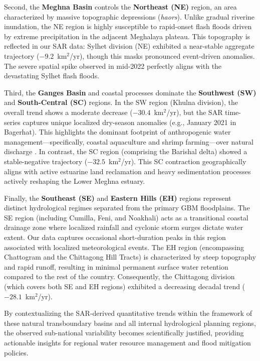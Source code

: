 \documentclass[fleqn,10pt,twocolumn]{article}
\begin{document}
Second, the \textbf{Meghna Basin} controls the \textbf{Northeast (NE)} region, an area characterized by massive topographic depressions (\textit{haors}). Unlike gradual riverine inundation, the NE region is highly susceptible to rapid-onset flash floods driven by extreme precipitation in the adjacent Meghalaya plateau. This topography is reflected in our SAR data: Sylhet division (NE) exhibited a near-stable aggregate trajectory ($-9.2$~km$^2$/yr), though this masks pronounced event-driven anomalies. The severe spatial spike observed in mid-2022 perfectly aligns with the devastating Sylhet flash floods.

Third, the \textbf{Ganges Basin} and coastal processes dominate the \textbf{Southwest (SW)} and \textbf{South-Central (SC)} regions. In the SW region (Khulna division), the overall trend shows a moderate decrease ($-30.4$~km$^2$/yr), but the SAR time-series captures unique localized dry-season anomalies (e.g., January 2021 in Bagerhat). This highlights the dominant footprint of anthropogenic water management---specifically, coastal aquaculture and shrimp farming---over natural discharge \cite{paul2013, haque2022}. In contrast, the SC region (comprising the Barishal delta) showed a stable-negative trajectory ($-32.5$~km$^2$/yr). This SC contraction geographically aligns with active estuarine land reclamation and heavy sedimentation processes actively reshaping the Lower Meghna estuary.

Finally, the \textbf{Southeast (SE)} and \textbf{Eastern Hills (EH)} regions represent distinct hydrological regimes separated from the primary GBM floodplains. The SE region (including Cumilla, Feni, and Noakhali) acts as a transitional coastal drainage zone where localized rainfall and cyclonic storm surges dictate water extent. Our data captures occasional short-duration peaks in this region associated with localized meteorological events. The EH region (encompassing Chattogram and the Chittagong Hill Tracts) is characterized by steep topography and rapid runoff, resulting in minimal permanent surface water retention compared to the rest of the country. Consequently, the Chittagong division (which covers both SE and EH regions) exhibited a decreasing decadal trend ($-28.1$~km$^2$/yr).

By contextualizing the SAR-derived quantitative trends within the framework of these natural transboundary basins and all internal hydrological planning regions, the observed sub-national variability becomes scientifically justified, providing actionable insights for regional water resource management and flood mitigation policies.
\end{document}
